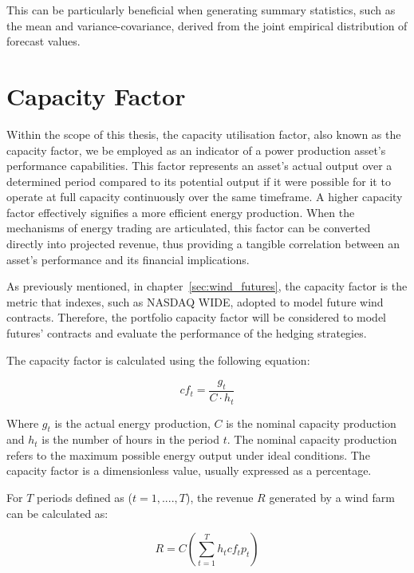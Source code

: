     This can be particularly beneficial when generating summary statistics, such as the mean and variance-covariance,
    derived from the joint empirical distribution of forecast values.

\section{Capacity Factor}
    \label{sec:capacity_factor}

    Within the scope of this thesis, the capacity utilisation factor, also known as the capacity factor, we be employed
    as an indicator of a power production asset's performance capabilities.
    This factor represents an asset's actual output over a determined period compared to its potential output
    if it were possible for it to operate at full capacity continuously over the same timeframe.
    A higher capacity factor effectively signifies a more efficient energy production.
    When the mechanisms of energy trading are articulated, this factor can be converted directly into projected revenue,
    thus providing a tangible correlation between an asset’s performance and its financial implications.

    As previously mentioned, in chapter~\ref{sec:wind_futures},
    the capacity factor is the metric that indexes, such as NASDAQ WIDE, adopted to model future wind contracts.
    Therefore, the portfolio capacity factor will be considered to model futures' contracts and evaluate the
    performance of the hedging strategies.

    The capacity factor is calculated using the following equation:

    \begin{equation}
        cf_t =
        \frac{g_{t}}{C \cdot h_{t}}
    \label{eq:capacity_factor}
    \end{equation}

    Where $g_{t}$ is the actual energy production, $C$ is the nominal capacity production and $h_{t}$ is the
    number of hours in the period $t$.
    The nominal capacity production refers to the maximum possible energy output under ideal conditions.
    The capacity factor is a dimensionless value, usually expressed as a percentage.

    For $T$ periods defined as ($t=1,....,T$), the revenue $R$ generated by a wind farm can be calculated as:

    \begin{equation}
        R = C \left( \sum_{t=1}^{T} h_{t} cf_{t} p_{t} \right)
    \label{eq:revenue_wf}
    \end{equation}

